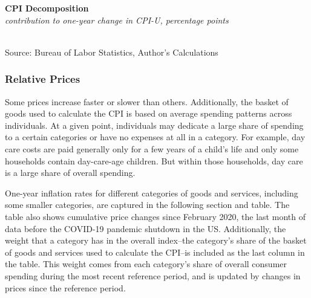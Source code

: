 \documentclass{report}
\makeatletter
\newcommand{\tbllink}[1]{\href{https://raw.githubusercontent.com/bdecon/US-chartbook/master/chartbook/data/#1}{\faTable}}
\newcommand*\short[1]{\expandafter\@gobbletwo\number\numexpr#1\relax}
\newcommand{\ctsbar}[5]{
		\addplot[ybar stacked, bar width=#5, draw opacity=0, fill=#1] 
			table [x=#2, y=#3, col sep=comma]{#4};}
\newcommand{\tydateaxisticks}{
		date coordinates in=x, axis line style={draw=none},
		xmax={2022-10-31}, max space between ticks=40,	    
		xtick={{2011-01-01}, {2012-01-01}, {2013-01-01}, {2014-01-01}, {2015-01-01}, {2016-01-01}, 
			{2017-01-01}, {2018-01-01}, {2019-01-01}, {2020-01-01}, {2021-01-01}, {2022-01-01}},
		enlarge y limits={0.06}, enlarge x limits={0.01},
		}
\newcommand{\bbar}[2]{extra #1 ticks = {{#2}}, extra #1 tick labels = ,
		extra #1 tick style = {grid=major, grid style={thick, black!25}},}
\newcommand{\rbars}{
		\fill[color=black!10] (axis cs:{1990-07-01},\pgfkeysvalueof{/pgfplots/ymin}) rectangle 
			(axis cs:{1991-03-01}, \pgfkeysvalueof{/pgfplots/ymax});
		\fill[color=black!10] (axis cs:{2007-12-01},\pgfkeysvalueof{/pgfplots/ymin}) rectangle 
			(axis cs:{2009-07-01}, \pgfkeysvalueof{/pgfplots/ymax});
		\fill[color=black!10] (axis cs:{2001-03-01},\pgfkeysvalueof{/pgfplots/ymin}) rectangle 
			(axis cs:{2001-11-01}, \pgfkeysvalueof{/pgfplots/ymax});
		\fill[color=black!10] (axis cs:{2020-02-01},\pgfkeysvalueof{/pgfplots/ymin}) rectangle 
			(axis cs:{2020-05-01}, \pgfkeysvalueof{/pgfplots/ymax});}
\makeatother
\begin{document}
{\begin{minipage}{0.76\textwidth}

\vspace{1mm}

\normalsize \textbf{CPI Decomposition}\\
\footnotesize{\textit{contribution to one-year change in CPI-U, percentage points}}\\
\hspace*{-2mm} \\
\footnotesize{Source: Bureau of Labor Statistics, Author's Calculations} \hfill \tbllink{cpi_decomp.csv}
\vspace{4mm}

\subsubsection*{Relative Prices}
\small Some prices increase faster or slower than others. Additionally, the basket of goods used to calculate the CPI is based on average spending patterns across individuals. At a given point, individuals may dedicate a large share of spending to a certain categories or have no expenses at all in a category. For example, day care costs are paid generally only for a few years of a child's life and only some households contain day-care-age children. But within those households, day care is a large share of overall spending. 

One-year inflation rates for different categories of goods and services, including some smaller categories, are captured in the following section and table. The table also shows cumulative price changes since February 2020, the last month of data before the COVID-19 pandemic shutdown in the US. Additionally, the weight that a category has in the overall index--the category's share of the basket of goods and services used to calculate the CPI--is included as the last column in the table. This weight comes from each category's share of overall consumer spending during the most recent reference period, and is updated by changes in prices since the reference period. 
\end{minipage}
\newpage
\begin{minipage}{0.76\textwidth}
\small 
\vspace{1.5mm}


\end{minipage}}
\end{document}
